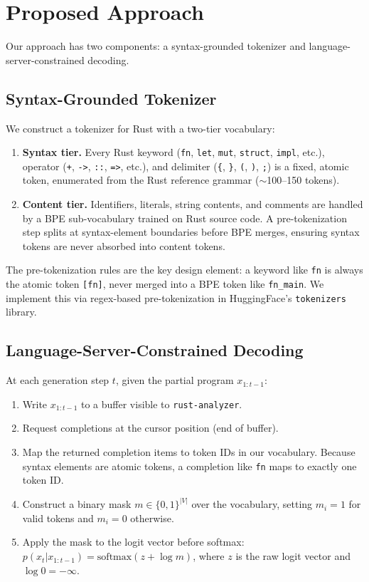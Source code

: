 \documentclass[11pt,letterpaper]{article}
\begin{document}
\section{Proposed Approach}

Our approach has two components: a syntax-grounded tokenizer and language-server-constrained decoding.

\subsection{Syntax-Grounded Tokenizer}

We construct a tokenizer for Rust with a two-tier vocabulary:

\begin{enumerate}[leftmargin=*,itemsep=2pt]
  \item \textbf{Syntax tier.} Every Rust keyword (\texttt{fn}, \texttt{let}, \texttt{mut}, \texttt{struct}, \texttt{impl}, etc.), operator (\texttt{+}, \texttt{->}, \texttt{::}, \texttt{=>}, etc.), and delimiter (\texttt{\{}, \texttt{\}}, \texttt{(}, \texttt{)}, \texttt{;}) is a fixed, atomic token, enumerated from the Rust reference grammar (${\sim}$100--150 tokens).

  \item \textbf{Content tier.} Identifiers, literals, string contents, and comments are handled by a BPE sub-vocabulary trained on Rust source code. A pre-tokenization step splits at syntax-element boundaries before BPE merges, ensuring syntax tokens are never absorbed into content tokens.
\end{enumerate}

The pre-tokenization rules are the key design element: a keyword like \texttt{fn} is always the atomic token \texttt{[fn]}, never merged into a BPE token like \texttt{fn\_main}. We implement this via regex-based pre-tokenization in HuggingFace's \texttt{tokenizers} library.

\subsection{Language-Server-Constrained Decoding}

At each generation step $t$, given the partial program $x_{1:t-1}$:

\begin{enumerate}[leftmargin=*]
  \item Write $x_{1:t-1}$ to a buffer visible to \texttt{rust-analyzer}.
  \item Request completions at the cursor position (end of buffer).
  \item Map the returned completion items to token IDs in our vocabulary. Because syntax elements are atomic tokens, a completion like \texttt{fn} maps to exactly one token ID.
  \item Construct a binary mask $m \in \{0, 1\}^{|V|}$ over the vocabulary, setting $m_i = 1$ for valid tokens and $m_i = 0$ otherwise.
  \item Apply the mask to the logit vector before softmax: $p(x_t | x_{1:t-1}) = \text{softmax}(z + \log m)$, where $z$ is the raw logit vector and $\log 0 = -\infty$.
\end{enumerate}
\end{document}
